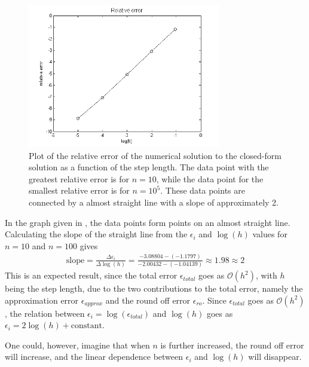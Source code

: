 \begin{figure}[H]
	\centering
	\includegraphics[width=0.75\textwidth]{Figures/relativeerror5.png}
	\caption{Plot of the relative error of the numerical solution to the closed-form solution as a function of the step length. 
	The data point with the greatest relative error is for $n=10$, while the data point for the smallest relative error is for $n=10^5$.
	These data points are connected by a almost straight line with a slope of approximately 2.}
	\label{fig:IntOfResult3}
\end{figure}
In the graph given in , the data points form points on an almost straight line. 
Calculating the slope of the straight line from the $\epsilon_i$ and $\log (h)$ values for $n=10$ and $n=100$ gives
\begin{align}
	\text{slope} = \frac{\Delta \epsilon_i}{\Delta \log (h)}
	= \frac{-3.08804 - (-1.1797)}{-2.00432 - (-1.04139)}
	\approx 1.98 \approx 2
	\label{eq:SlopeOfError}
\end{align}
This is an expected result, since the total error $\epsilon_{total}$ goes as $\mathcal{O}(h^2)$, with $h$ being the step length, due to the two contributions to the total error, namely the approximation error $\epsilon_{approx}$ and the round off error $\epsilon_{ro}$.
Since $\epsilon_{total}$ goes as $\mathcal{O}(h^2)$, the relation between $\epsilon_{i} = \log(\epsilon_{total})$ and $\log (h)$ goes as $\epsilon_{i} = 2\log (h) + \text{constant}$. 

One could, however, imagine that when $n$ is further increased, the round off error will increase, and the linear dependence between $\epsilon_i$ and $\log (h)$ will disappear.
